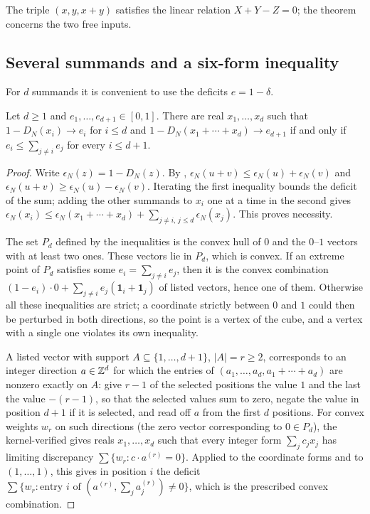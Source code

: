 \documentclass[11pt]{article}
\newcommand{\ttt}[1]{\texttt{#1}}
\newcommand{\leanP}[3]{\leanat{\phaseXIXcommit}{#1}{#2}{#3}}
\begin{document}
The triple $(x,y,x+y)$ satisfies the linear relation $X+Y-Z=0$; the theorem concerns the two free
inputs.

\subsection{Several summands and a six-form inequality}

For $d$ summands it is convenient to use the deficits $e=1-\delta$.

\begin{theorem}[$d$ summands]\label{thm:dsummands}
Let $d\ge1$ and $e_1,\ldots,e_{d+1}\in[0,1]$. There are real $x_1,\ldots,x_d$ such that
$1-D_N(x_i)\to e_i$ for $i\le d$ and $1-D_N(x_1+\cdots+x_d)\to e_{d+1}$ if and only if
$e_i\le\sum_{j\ne i}e_j$ for every $i\le d+1$.
\end{theorem}

\begin{proof}
Write $\epsilon_N(z)=1-D_N(z)$. By , $\epsilon_N(u+v)\le\epsilon_N(u)+\epsilon_N(v)$ and
$\epsilon_N(u+v)\ge\epsilon_N(u)-\epsilon_N(v)$. Iterating the first inequality bounds the deficit of the
sum; adding the other summands to $x_i$ one at a time in the second gives
$\epsilon_N(x_i)\le\epsilon_N(x_1+\cdots+x_d)+\sum_{j\ne i,\,j\le d}\epsilon_N(x_j)$. This proves necessity.

The set $P_d$ defined by the inequalities is the convex hull of $0$ and the $0$--$1$ vectors with at
least two ones. These vectors lie in $P_d$, which is convex. If an extreme point of $P_d$ satisfies some
$e_i=\sum_{j\ne i}e_j$, then it is the convex combination
$(1-e_i)\cdot0+\sum_{j\ne i}e_j(\mathbf1_i+\mathbf1_j)$ of listed vectors, hence one of them. Otherwise all
these inequalities are strict; a coordinate strictly between $0$ and $1$ could then be perturbed in both
directions, so the point is a vertex of the cube, and a vertex with a single one violates its own
inequality.

A listed vector with support $A\subseteq\{1,\ldots,d+1\}$, $|A|=r\ge2$, corresponds to an integer
direction $a\in\mathbb Z^d$ for which the entries of $(a_1,\ldots,a_d,a_1+\cdots+a_d)$ are nonzero exactly on
$A$: give $r-1$ of the selected positions the value $1$ and the last the value $-(r-1)$, so that the
selected values sum to zero, negate the value in position $d+1$ if it is selected, and read off $a$ from
the first $d$ positions. For convex weights $w_r$ on such directions (the zero vector corresponding to
$0\in P_d$), the kernel-verified \leanP{AdditionSpectrum}{1470}{\ttt{mixtureRealizable}} gives reals
$x_1,\ldots,x_d$ such that every integer form $\sum_jc_jx_j$ has limiting discrepancy
$\sum\{w_r:c\cdot a^{(r)}=0\}$. Applied to the coordinate forms and to $(1,\ldots,1)$, this gives in
position $i$ the deficit $\sum\{w_r:\text{entry }i\text{ of }(a^{(r)},\textstyle\sum_ja^{(r)}_j)\ne0\}$,
which is the prescribed convex combination.
\end{proof}
\end{document}

